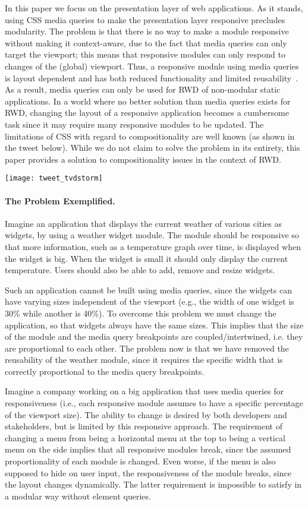 \documentclass[sigplan,9pt]{acmart}
\begin{document}
  In this paper we focus on the presentation layer of web applications.
  As it stands, using CSS media queries to make the presentation layer responsive precludes modularity.
  The problem is that there is no way to make a module responsive without making it context-aware, due to the fact that media queries can only target the viewport; this means that responsive modules can only respond to changes of the (global) viewport.
  Thus, a responsive module using media queries is layout dependent and has both reduced functionality and limited reusability~\cite{elq-thesis}.
  As a result, media queries can only be used for RWD of non-modular static applications.
  In a world where no better solution than media queries exists for RWD, changing the layout of a responsive application becomes a cumbersome task since it may require many responsive modules to be updated.
  The limitations of CSS with regard to compositionality are well known (as shown in the tweet below). While we do not claim to solve the problem in its entirety, this paper provides a solution to compositionality issues in the context of RWD.

  \texttt{[image: tweet\_tvdstorm]}

  \paragraph{The Problem Exemplified.}
    Imagine an application that displays the current weather of various cities as widgets, by using a weather widget module.
    The module should be responsive so that more information, such as a temperature graph over time, is displayed when the widget is big.
    When the widget is small it should only display the current temperature.
    Users should also be able to add, remove and resize widgets.

    Such an application cannot be built using media queries, since the widgets can have varying sizes independent of the viewport (e.g., the width of one widget is 30\% while another is 40\%).
    To overcome this problem we must change the application, so that widgets always have the same sizes.
    This implies that the size of the module and the media query breakpoints are coupled/intertwined, i.e. they are proportional to each other.
    The problem now is that we have removed the reusability of the weather module, since it requires the specific width that is correctly proportional to the media query breakpoints.

    Imagine a company working on a big application that uses media queries for responsiveness (i.e., each responsive module assumes to have a specific percentage of the viewport size).
    The ability to change is desired by both developers and stakeholders, but is limited by this responsive approach.
    The requirement of changing a menu from being a horizontal menu at the top to being a vertical menu on the side implies that all responsive modules break, since the assumed proportionality of each module is changed.
    Even worse, if the menu is also supposed to hide on user input, the responsiveness of the module breaks, since the layout changes dynamically.
    The latter requirement is impossible to satisfy in a modular way without element queries.
\end{document}
